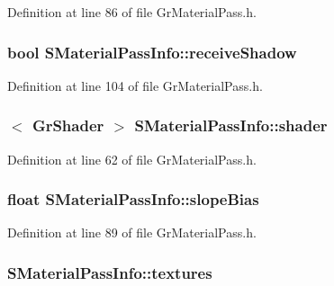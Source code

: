 Definition at line 86 of file GrMaterialPass.h.\hypertarget{struct_s_material_pass_info_47b874b3efb05afc0ccbecc01ebf62bc}{
\subsubsection[{receiveShadow}]{\setlength{\rightskip}{0pt plus 5cm}bool {\bf SMaterialPassInfo::receiveShadow}}}
\label{struct_s_material_pass_info_47b874b3efb05afc0ccbecc01ebf62bc}




Definition at line 104 of file GrMaterialPass.h.\hypertarget{struct_s_material_pass_info_88f257e5b6e6b9e21392219be74df05c}{
\subsubsection[{shader}]{$<$ {\bf GrShader} $>$ {\bf SMaterialPassInfo::shader}}}
\label{struct_s_material_pass_info_88f257e5b6e6b9e21392219be74df05c}




Definition at line 62 of file GrMaterialPass.h.\hypertarget{struct_s_material_pass_info_43b0b16486a5a825210158b5c55db342}{
\subsubsection[{slopeBias}]{\setlength{\rightskip}{0pt plus 5cm}float {\bf SMaterialPassInfo::slopeBias}}}
\label{struct_s_material_pass_info_43b0b16486a5a825210158b5c55db342}




Definition at line 89 of file GrMaterialPass.h.\hypertarget{struct_s_material_pass_info_3696de9c4421b3ff40036e84bde3e630}{
\subsubsection[{textures}]{ {\bf SMaterialPassInfo::textures}}}
\label{struct_s_material_pass_info_3696de9c4421b3ff40036e84bde3e630}




